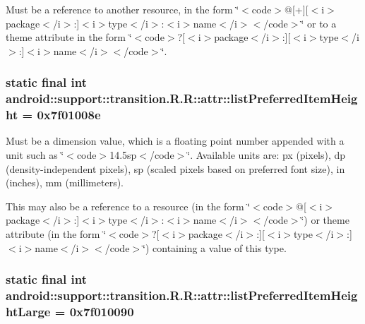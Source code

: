 Must be a reference to another resource, in the form \char`\"{}$<$code$>$@\mbox{[}+\mbox{]}\mbox{[}$<$i$>$package$<$/i$>$:\mbox{]}$<$i$>$type$<$/i$>$:$<$i$>$name$<$/i$>$$<$/code$>$\char`\"{} or to a theme attribute in the form \char`\"{}$<$code$>$?\mbox{[}$<$i$>$package$<$/i$>$:\mbox{]}\mbox{[}$<$i$>$type$<$/i$>$:\mbox{]}$<$i$>$name$<$/i$>$$<$/code$>$\char`\"{}. \hypertarget{classandroid_1_1support_1_1transition_1_1_r_1_1attr_b96a3696988095a069dd3c07b3bff365}{
\subsubsection[{listPreferredItemHeight}]{\setlength{\rightskip}{0pt plus 5cm}static final int android::support::transition.R.R::attr::listPreferredItemHeight = 0x7f01008e}}
\label{classandroid_1_1support_1_1transition_1_1_r_1_1attr_b96a3696988095a069dd3c07b3bff365}


Must be a dimension value, which is a floating point number appended with a unit such as \char`\"{}$<$code$>$14.5sp$<$/code$>$\char`\"{}. Available units are: px (pixels), dp (density-independent pixels), sp (scaled pixels based on preferred font size), in (inches), mm (millimeters). 

This may also be a reference to a resource (in the form \char`\"{}$<$code$>$@\mbox{[}$<$i$>$package$<$/i$>$:\mbox{]}$<$i$>$type$<$/i$>$:$<$i$>$name$<$/i$>$$<$/code$>$\char`\"{}) or theme attribute (in the form \char`\"{}$<$code$>$?\mbox{[}$<$i$>$package$<$/i$>$:\mbox{]}\mbox{[}$<$i$>$type$<$/i$>$:\mbox{]}$<$i$>$name$<$/i$>$$<$/code$>$\char`\"{}) containing a value of this type. \hypertarget{classandroid_1_1support_1_1transition_1_1_r_1_1attr_c4a1ce874d776080fc26115c6b925a67}{
\subsubsection[{listPreferredItemHeightLarge}]{\setlength{\rightskip}{0pt plus 5cm}static final int android::support::transition.R.R::attr::listPreferredItemHeightLarge = 0x7f010090}}
\label{classandroid_1_1support_1_1transition_1_1_r_1_1attr_c4a1ce874d776080fc26115c6b925a67}



